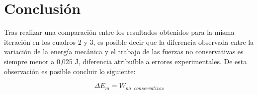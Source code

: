 \documentclass{article}
\begin{document}
\section{Conclusi\'{o}n}

Tras realizar una comparación entre los resultados obtenidos para la misma iteración en los cuadros 2 y 3, es posible decir que la diferencia observada entre la variación de la energía mecánica y el trabajo de las fuerzas no conservativas es siempre menor a 0,025 J, diferencia atribuíble a errores experimentales. De esta observación es posible concluir lo siguiente:

\begin{equation}
\Delta E_m = W_{\text{$no$ $conservativas$}}
\end{equation}
\end{document}
